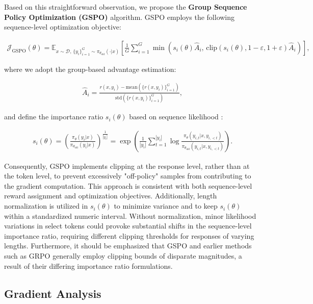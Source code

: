 Based on this straightforward observation, we propose the \textbf{Group Sequence Policy Optimization (GSPO)} algorithm. GSPO employs the following sequence-level optimization objective:

\begin{align}
\mathcal{J}_\text{GSPO} (\theta) =
\mathbb{E}_{ x \sim \mathcal{D},\, \{y_i\}_{i=1}^G \sim \pi_{\theta_\text{old}}( \cdot | x) }
\left[ 
\frac{1}{G} \sum_{i=1}^{G}
\min \left( s_{i}(\theta)  \widehat{A}_{i},  \, \mathrm{clip} \left( s_{i}(\theta), 1 - {\varepsilon}, 1 + {\varepsilon} \right) \widehat{A}_{i} \right) 
\right],
\label{equ:gspo}
\end{align}

where we adopt the group-based advantage estimation:

\begin{align}
\widehat{A}_{i} = \frac{r(x, y_i) - \mathrm{mean} \left( \{ r(x, y_i) \}_{i=1}^G \right) }{ \mathrm{std} \left( \{ r(x, y_i) \}_{i=1}^G \right) },
\end{align}

and define the importance ratio $s_{i}(\theta)$ based on sequence likelihood \citep{click}:

\begin{align}
s_{i}(\theta) = \left( \frac{ \pi_{\theta} (y_i | x) }{ \pi_{\theta_\text{old}} (y_i | x)} \right)^{\frac{1}{|y_i|}}
=
\exp \left( \frac{1}{|y_i|} \sum_{t=1}^{|y_i|} \log \frac{ \pi_{\theta} (y_{i,t} | x, y_{i,<t}) }{ \pi_{\theta_\text{old}} (y_{i,t} | x,y_{i,<t})} \right).
\end{align}

Consequently, GSPO implements clipping at the response level, rather than at the token level, to prevent excessively "off-policy" samples from contributing to the gradient computation. This approach is consistent with both sequence-level reward assignment and optimization objectives. Additionally, length normalization is utilized in $s_{i}(\theta)$ to minimize variance and to keep $s_{i}(\theta)$ within a standardized numeric interval. Without normalization, minor likelihood variations in select tokens could provoke substantial shifts in the sequence-level importance ratio, requiring different clipping thresholds for responses of varying lengths. Furthermore, it should be emphasized that GSPO and earlier methods such as GRPO generally employ clipping bounds of disparate magnitudes, a result of their differing importance ratio formulations.

\subsection{Gradient Analysis}
\label{subsec:gradient}

